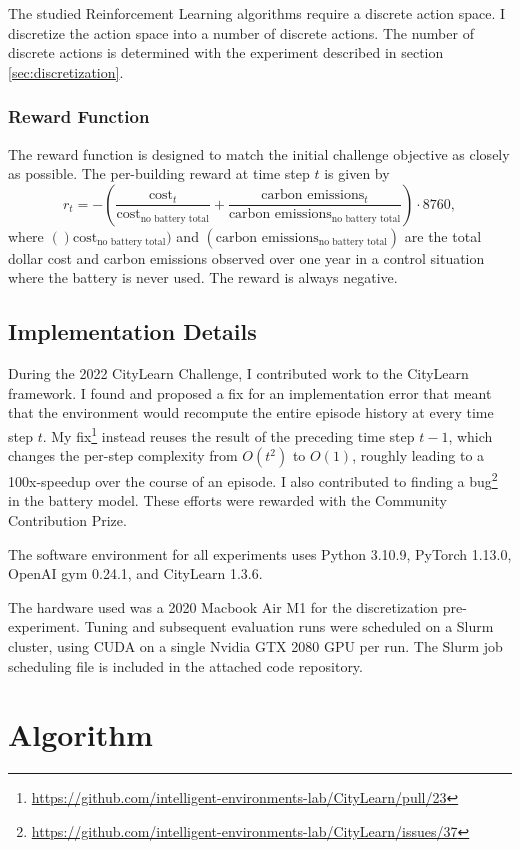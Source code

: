 The studied Reinforcement Learning algorithms require a discrete action space.
I discretize the action space into a number of discrete actions. The number of discrete actions is determined with the experiment described in section \ref{sec:discretization}.

\subsubsection{Reward Function}
The reward function is designed to match the initial challenge objective as closely as possible.
The per-building reward at time step $t$ is given by
$$r_t = - \left(\frac{\text{cost}_t}{\text{cost}_\text{no battery total}}
    + \frac{\text{carbon emissions}_t}{\text{carbon emissions}_\text{no battery total}}\right) \cdot 8760,$$
where $()\text{cost}_\text{no battery total})$ and $(\text{carbon emissions}_\text{no battery total})$ are the total dollar cost and carbon emissions observed over one year in a control situation where the battery is never used.
The reward is always negative.

\subsection{Implementation Details}
During the 2022 CityLearn Challenge, I contributed work to the CityLearn framework.
I found and proposed a fix for an implementation error that meant that the environment would recompute the entire episode history at every time step $t$.
My fix\footnote{\url{https://github.com/intelligent-environments-lab/CityLearn/pull/23}} instead reuses the result of the preceding time step $t-1$, which changes the per-step complexity from $O(t^2)$ to $O(1)$, roughly leading to a 100x-speedup over the course of an episode.
I also contributed to finding a bug\footnote{\url{https://github.com/intelligent-environments-lab/CityLearn/issues/37}} in the battery model.
These efforts were rewarded with the Community Contribution Prize.

The software environment for all experiments uses Python 3.10.9, PyTorch 1.13.0, OpenAI gym 0.24.1, and CityLearn 1.3.6.

The hardware used was a 2020 Macbook Air M1 for the discretization pre-experiment. Tuning and subsequent evaluation runs were scheduled on a Slurm cluster, using CUDA on a single Nvidia GTX 2080 GPU per run. The Slurm job scheduling file is included in the attached code repository.


\section{Algorithm}

